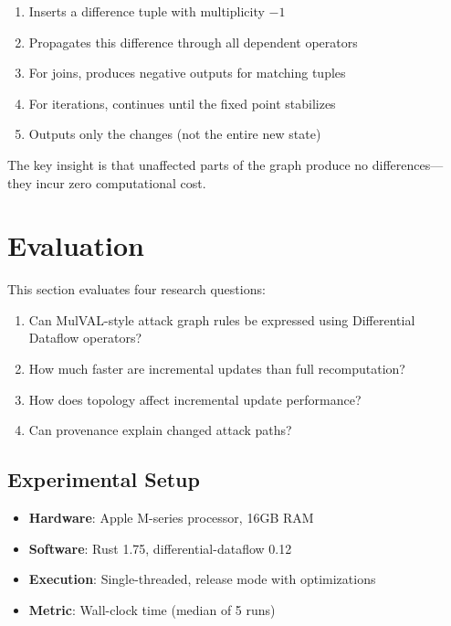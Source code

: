 \documentclass[conference]{IEEEtran}
\begin{document}
\begin{enumerate}
    \item Inserts a difference tuple with multiplicity $-1$
    \item Propagates this difference through all dependent operators
    \item For joins, produces negative outputs for matching tuples
    \item For iterations, continues until the fixed point stabilizes
    \item Outputs only the changes (not the entire new state)
\end{enumerate}

The key insight is that unaffected parts of the graph produce no differences---they incur zero computational cost.

\section{Evaluation}

This section evaluates four research questions:

\begin{enumerate}
    \item[\textbf{RQ1}] Can MulVAL-style attack graph rules be expressed using Differential Dataflow operators?
    \item[\textbf{RQ2}] How much faster are incremental updates than full recomputation?
    \item[\textbf{RQ3}] How does topology affect incremental update performance?
    \item[\textbf{RQ4}] Can provenance explain changed attack paths?
\end{enumerate}

\subsection{Experimental Setup}

\begin{itemize}
    \item \textbf{Hardware}: Apple M-series processor, 16GB RAM
    \item \textbf{Software}: Rust 1.75, differential-dataflow 0.12
    \item \textbf{Execution}: Single-threaded, release mode with optimizations
    \item \textbf{Metric}: Wall-clock time (median of 5 runs)
\end{itemize}
\end{document}
